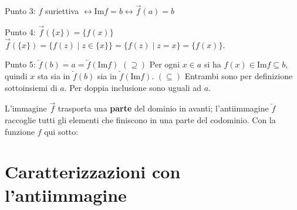 \begin{concetto}
\begin{dimostrazione}
\begin{caso}{Punto 3: $f$ suriettiva $\leftrightarrow \mathrm{Im} f = b \leftrightarrow \overrightarrow{f}(a) = b$}
    \end{caso}
    \begin{caso}{Punto 4: $\overrightarrow{f}(\{x\}) = \{f(x)\}$}
        $\overrightarrow{f}(\{x\}) = \{f(z) \mid z \in \{x\}\} = \{f(z) \mid z = x\} = \{f(x)\}$.
    \end{caso}
    \begin{caso}{Punto 5: $\overleftarrow{f}(b) = a = \overleftarrow{f}(\mathrm{Im} f)$}
        $(\supseteq)$ Per ogni $x \in a$ si ha $f(x) \in \mathrm{Im} f \subseteq b$, quindi $x$ sta sia in $\overleftarrow{f}(b)$ sia in
        $\overleftarrow{f}(\mathrm{Im} f)$. $(\subseteq)$ Entrambi sono per definizione sottoinsiemi di $a$.
        Per doppia inclusione sono uguali ad $a$.
    \end{caso}
\end{dimostrazione}
\end{concetto}

\begin{spiegazione}
    L'immagine $\overrightarrow{f}$ trasporta una \textbf{parte} del dominio in avanti; l'antiimmagine $\overleftarrow{f}$ raccoglie tutti gli elementi che finiscono in una parte
    del codominio. Con la funzione $f$ qui sotto:
    \begin{center}
    \end{center}
\end{spiegazione}


\section{Caratterizzazioni con l'antiimmagine}\label{sec:caratt-antiimmagine}

